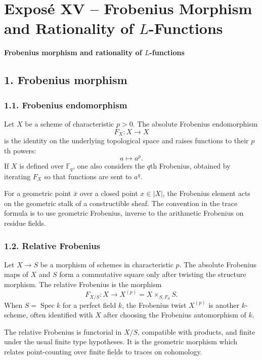 \documentclass[14pt]{extarticle}
\newcommand{\FF}{\mathbb F}
\newcommand{\Spec}{\operatorname{Spec}}
\begin{document}
\newpage

\section*{Expos\'e XV -- Frobenius Morphism and Rationality of $L$-Functions}

\begin{center}
\textbf{Frobenius morphism and rationality of $L$-functions}
\end{center}

\subsection*{1. Frobenius morphism}

\subsubsection*{1.1. Frobenius endomorphism}

Let $X$ be a scheme of characteristic $p>0$. The absolute Frobenius endomorphism
\[
   F_X:X\to X
\]
is the identity on the underlying topological space and raises functions to their $p$th powers:
\[
   a\longmapsto a^p.
\]
If $X$ is defined over $\FF_q$, one also considers the $q$th Frobenius, obtained by iterating $F_X$ so that functions are sent to $a^q$.

For a geometric point $\bar x$ over a closed point $x\in |X|$, the Frobenius element acts on the geometric stalk of a constructible sheaf. The convention in the trace formula is to use geometric Frobenius, inverse to the arithmetic Frobenius on residue fields.

\subsubsection*{1.2. Relative Frobenius}

Let $X\to S$ be a morphism of schemes in characteristic $p$. The absolute Frobenius maps of $X$ and $S$ form a commutative square only after twisting the structure morphism. The relative Frobenius is the morphism
\[
   F_{X/S}:X\to X^{(p)}=X\times_{S,F_S}S.
\]
When $S=\Spec k$ for a perfect field $k$, the Frobenius twist $X^{(p)}$ is another $k$-scheme, often identified with $X$ after choosing the Frobenius automorphism of $k$.

The relative Frobenius is functorial in $X/S$, compatible with products, and finite under the usual finite type hypotheses. It is the geometric morphism which relates point-counting over finite fields to traces on cohomology.
\end{document}
